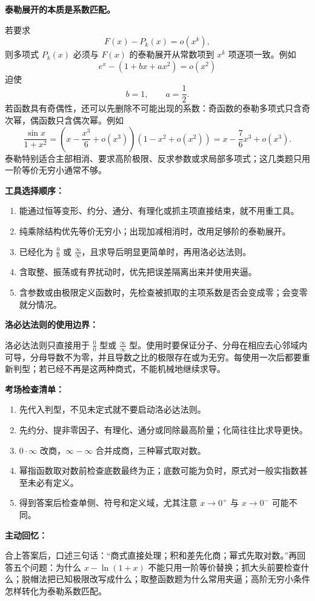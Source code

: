 \begin{knowledgeBox}
\textbf{泰勒展开的本质是系数匹配。}

若要求
\[
F(x)-P_k(x)=o(x^k),
\]
则多项式 \(P_k(x)\) 必须与 \(F(x)\) 的泰勒展开从常数项到 \(x^k\) 项逐项一致。例如
\[
e^x-\left(1+bx+ax^2\right)=o(x^2)
\]
迫使
\[
b=1,\qquad a=\frac12.
\]
若函数具有奇偶性，还可以先删除不可能出现的系数：奇函数的泰勒多项式只含奇次幂，偶函数只含偶次幂。例如
\[
\frac{\sin x}{1+x^2}
=\left(x-\frac{x^3}{6}+o(x^3)\right)
\left(1-x^2+o(x^2)\right)
=x-\frac76x^3+o(x^3).
\]
泰勒特别适合主部相消、要求高阶极限、反求参数或求局部多项式；这几类题只用一阶等价无穷小通常不够。

\textbf{工具选择顺序：}

\begin{enumerate}
  \item 能通过恒等变形、约分、通分、有理化或抓主项直接结束，就不用重工具。
  \item 纯乘除结构优先等价无穷小；出现加减相消时，改用足够阶的泰勒展开。
  \item 已经化为 \(\frac00\) 或 \(\frac{\infty}{\infty}\)，且求导后明显更简单时，再用洛必达法则。
  \item 含取整、振荡或有界扰动时，优先把误差隔离出来并使用夹逼。
  \item 含参数或由极限定义函数时，先检查被抓取的主项系数是否会变成零；会变零就分情况。
\end{enumerate}

\textbf{洛必达法则的使用边界：}

洛必达法则只直接用于 \(\frac00\) 型或 \(\frac{\infty}{\infty}\) 型。使用时要保证分子、分母在相应去心邻域内可导，分母导数不为零，并且导数之比的极限存在或为无穷。每使用一次后都要重新判型；若已经不再是这两种商式，不能机械地继续求导。

\textbf{考场检查清单：}

\begin{enumerate}
  \item 先代入判型，不见未定式就不要启动洛必达法则。
  \item 先约分、提非零因子、有理化、通分或同除最高阶量；化简往往比求导更快。
  \item \(0\cdot\infty\) 改商，\(\infty-\infty\) 合并成商，三种幂式取对数。
  \item 幂指函数取对数前检查底数最终为正；底数可能为负时，原式对一般实指数甚至未必有定义。
  \item 得到答案后检查单侧、符号和定义域，尤其注意 \(x\to0^+\) 与 \(x\to0^-\) 可能不同。
\end{enumerate}

\textbf{主动回忆：}

合上答案后，口述三句话：“商式直接处理；积和差先化商；幂式先取对数。”再回答五个问题：为什么 \(x-\ln(1+x)\) 不能只用一阶等价替换；抓大头前要检查什么；脱帽法把已知极限改写成什么；取整函数题为什么常用夹逼；高阶无穷小条件怎样转化为泰勒系数匹配。
\end{knowledgeBox}


